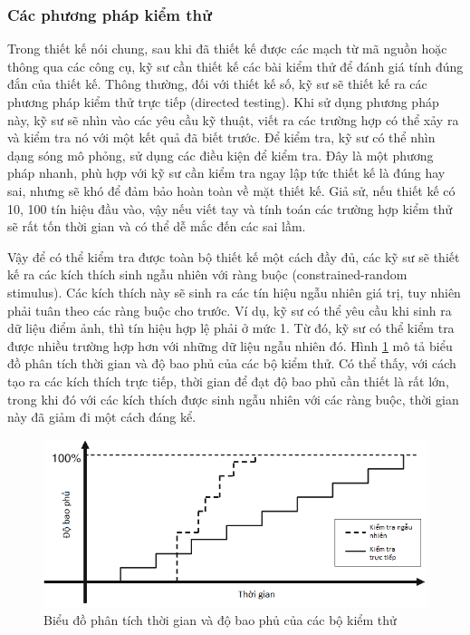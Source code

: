 \subsubsection{Các phương pháp kiểm thử}
Trong thiết kế nói chung, sau khi đã thiết kế được các mạch từ mã nguồn hoặc thông qua các công cụ, kỹ sư cần thiết kế các bài kiểm thử để đánh giá tính đúng đắn của thiết kế. Thông thường, đối với thiết kế số, kỹ sư sẽ thiết kế ra các phương pháp kiểm thử trực tiếp (directed testing). Khi sử dụng phương pháp này, kỹ sư sẽ nhìn vào các yêu cầu kỹ thuật, viết ra các trường hợp có thể xảy ra và kiểm tra nó với một kết quả đã biết trước. Để kiểm tra, kỹ sư có thể nhìn dạng sóng mô phỏng, sử dụng các điều kiện để kiểm tra. Đây là một phương pháp nhanh, phù hợp với kỹ sư cần kiểm tra ngay lập tức thiết kế là đúng hay sai, nhưng sẽ khó để đảm bảo hoàn toàn về mặt thiết kế. Giả sử, nếu thiết kế có 10, 100 tín hiệu đầu vào, vậy nếu viết tay và tính toán các trường hợp kiểm thử sẽ rất tốn thời gian và có thể dễ mắc đến các sai lầm.

Vậy để có thể kiểm tra được toàn bộ thiết kế một cách đầy đủ, các kỹ sư sẽ thiết kế ra các kích thích sinh ngẫu nhiên với ràng buộc (constrained-random stimulus). Các kích thích này sẽ sinh ra các tín hiệu ngẫu nhiên giá trị, tuy nhiên phải tuân theo các ràng buộc cho trước. Ví dụ, kỹ sư có thể yêu cầu khi sinh ra dữ liệu điểm ảnh, thì tín hiệu hợp lệ phải ở mức 1. Từ đó, kỹ sư có thể kiểm tra được nhiều trường hợp hơn với những dữ liệu ngẫu nhiên đó. Hình \ref{fig:verificationEva} mô tả biểu đồ phân tích thời gian và độ bao phủ của các bộ kiểm thử. Có thể thấy, với cách tạo ra các kích thích trực tiếp, thời gian để đạt độ bao phủ cần thiết là rất lớn, trong khi đó với các kích thích được sinh ngẫu nhiên với các ràng buộc, thời gian này đã giảm đi một cách đáng kể.

\begin{figure}[!ht]
\centering
\includegraphics[width=\linewidth]{figures/verificationEva.png}
\caption{Biểu đồ phân tích thời gian và độ bao phủ của các bộ kiểm thử}
\label{fig:verificationEva}
\end{figure}

